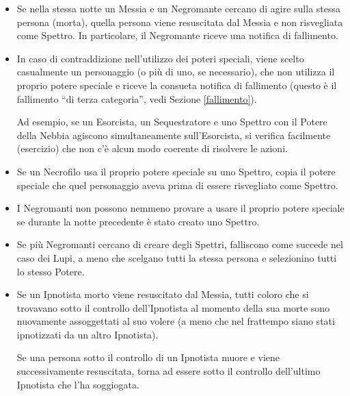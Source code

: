 \documentclass[a4paper,10pt]{article}
\begin{document}
\begin{itemize}
 \item Se nella stessa notte un Messia e un Negromante cercano di agire sulla stessa persona (morta), quella persona viene resuscitata dal Messia e non risvegliata come Spettro. In particolare, il Negromante riceve una notifica di fallimento.
 
 
 \item In caso di contraddizione nell'utilizzo dei poteri speciali, viene scelto casualmente un personaggio (o più di uno, se necessario), che non utilizza il proprio potere speciale e riceve la consueta notifica di fallimento (questo è il fallimento ``di terza categoria'', vedi Sezione \ref{fallimento}).
 
 Ad esempio, se un Esorcista, un Sequestratore e uno Spettro con il Potere della Nebbia agiscono simultaneamente sull'Esorcista, si verifica facilmente (esercizio) che non c'è alcun modo coerente di risolvere le azioni.
 
 \item Se un Necrofilo usa il proprio potere speciale su uno Spettro, copia il potere speciale che quel personaggio aveva prima di essere risvegliato come Spettro.
 
 \item I Negromanti non possono nemmeno provare a usare il proprio potere speciale se durante la notte precedente è stato creato uno Spettro.
 
 \item Se più Negromanti cercano di creare degli Spettri, falliscono come succede nel caso dei Lupi, a meno che scelgano tutti la stessa persona e selezionino tutti lo stesso Potere.

 \item Se un Ipnotista morto viene resuscitato dal Messia, tutti coloro che si trovavano sotto il controllo dell'Ipnotista al momento della sua morte sono nuovamente assoggettati al suo volere (a meno che nel frattempo siano stati ipnotizzati da un altro Ipnotista).
 
 Se una persona sotto il controllo di un Ipnotista muore e viene successivamente resuscitata, torna ad essere sotto il controllo dell'ultimo Ipnotista che l'ha soggiogata.
 

\end{itemize}
\end{document}
